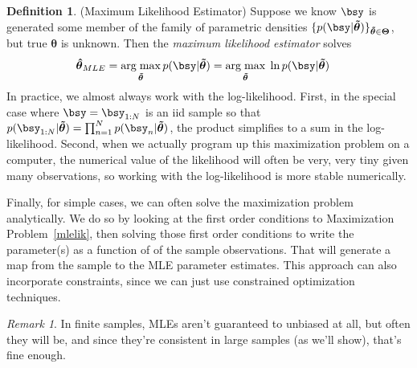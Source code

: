 \documentclass[12pt]{article}
\theoremstyle{plain}
\theoremstyle{definition}
\newtheorem{defn}[thm]{Definition}
\theoremstyle{remark}
\newtheorem*{rmk}{Remark}
\newcommand{\bstheta}{\boldsymbol{\theta}}
\newcommand{\bsTheta}{\boldsymbol{\Theta}}
\newcommand{\bshattheta}{\boldsymbol{\hat{\theta}}}
\newcommand{\bstildetheta}{\boldsymbol{\tilde{\theta}}}
\DeclareMathOperator*{\argmax}{arg\;max}
\newcommand{\nN}{_{n=1}^N}
\begin{document}
\begin{defn}(Maximum Likelihood Estimator)
\label{defn:mle}
Suppose we know $\bsy$ is generated some member of the family of
parametric densities
$\{p(\bsy|\bstildetheta)\}_{\bstildetheta\in\bsTheta}$, but true
$\bstheta$ is unknown.
Then the \emph{maximum likelihood estimator} solves
\begin{align}
  \bshattheta_{MLE}
  &=
  \argmax_{\bstildetheta} p(\bsy|\bstildetheta)
  =
  \argmax_{\bstildetheta}\;
  \ln p(\bsy|\bstildetheta)
  \label{mlelik}
\end{align}
In practice, we almost always work with the log-likelihood.
First, in the special case where $\bsy=\bsy_{1:N}$ is an iid sample so
that $p(\bsy_{1:N}|\bstildetheta)=\prod\nN p(\bsy_n|\bstildetheta)$, the
product simplifies to a sum in the log-likelihood. Second, when we
actually program up this maximization problem on a computer, the
numerical value of the likelihood will often be very, very tiny given
many observations, so working with the log-likelihood is more stable
numerically.

Finally, for simple cases, we can often solve the maximization problem
analytically. We do so by looking at the first order conditions to
Maximization Problem~\ref{mlelik}, then solving those first order
conditions to write the parameter(s) as a function of of the sample
observations. That will generate a map from the sample to the MLE
parameter estimates. This approach can also incorporate constraints,
since we can just use constrained optimization techniques.
\end{defn}
\begin{rmk}
In finite samples, MLEs aren't guaranteed to unbiased at all, but often
they will be, and since they're consistent in large samples (as we'll
show), that's fine enough.
\end{rmk}
\end{document}
